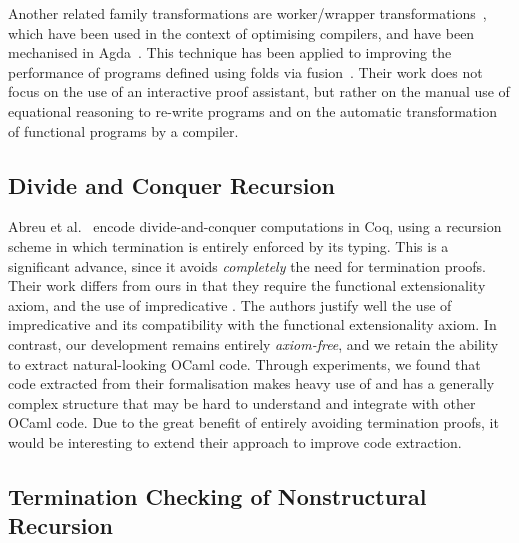 \documentclass[a4paper,anonymous, UKenglish,cleveref, autoref, thm-restate]{lipics-v2021}
\newcommand{\mvol}[1]{\textcolor{blue}{\textsc{Michael}: #1}}
\newcommand{\haskell}[1]{\texttt{#1}}
\begin{document}
Another related family transformations are worker/wrapper
transformations~\cite{gill09}, which have been used in the context of optimising
compilers, and have been mechanised in Agda~\cite{SCULTHORPE_HUTTON_2014}. This
technique has been applied to improving the performance of programs defined
using folds via fusion~\cite{hutton10}. Their work does not focus on the use of
an interactive proof assistant, but rather on the manual use of equational
reasoning to re-write programs and on the automatic transformation of functional
programs by a compiler.

\subsection{Divide and Conquer Recursion}\label{sec:reccoq}

Abreu et al.~\cite{AbreuDHJMS23} encode divide-and-conquer computations in Coq,
using a recursion scheme in which termination is entirely enforced by its
typing. This is a significant advance, since it avoids \emph{completely} the
need for termination proofs. Their work differs from ours in that they require
the functional extensionality axiom, and the use of impredicative . The
authors justify well the use of impredicative  and its compatibility
with the functional extensionality axiom. In contrast, our development remains
entirely \emph{axiom-free}, and we retain the ability to extract natural-looking
OCaml code.
Through experiments, we found that code extracted from their formalisation makes
heavy use of  and has a generally complex structure that may be
hard to understand and integrate with other OCaml code. Due to the great benefit
of entirely avoiding termination proofs, it would be interesting to extend their
approach to improve code extraction.

\subsection{Termination Checking of Nonstructural Recursion}\label{sec:termcheck}

\end{document}
